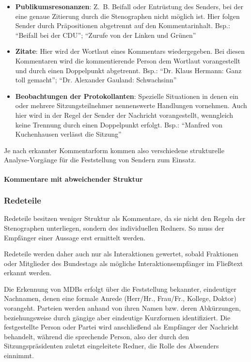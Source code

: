 \begin{itemize}
    \item \textbf{Publikumsresonanzen}: Z.~B. Beifall oder Entrüstung des
        Senders, bei der eine genaue Zitierung durch die Stenographen nicht
        möglich ist. Hier folgen Sender durch Präpositionen abgetrennt auf den
        Kommentarinhalt. Bsp.: \enquote{Beifall bei der CDU}; \enquote{Zurufe
        von der Linken und Grünen}
    \item \textbf{Zitate}: Hier wird der Wortlaut eines Kommentars
        wiedergegeben. Bei diesen Kommentaren wird die kommentierende Person
        dem Wortlaut vorangestellt und durch einen Doppelpunkt abgetrennt.
        Bsp.: \enquote{Dr. Klaus Hermann: Ganz toll gemacht}; \enquote{Dr.
        Alexander Gauland: Schwachsinn}
    \item \textbf{Beobachtungen der Protokollanten}: Spezielle Situationen in
        denen ein oder mehrere Sitzungsteilnehmer nennenswerte Handlungen
        vornehmen. Auch hier wird in der Regel der Sender der Nachricht
        vorangestellt, wenngleich keine Trennung durch einen Doppelpunkt
        erfolgt. Bsp.: \enquote{Manfred von Kuchenhausen verlässt die Sitzung}
\end{itemize}

Je nach erkannter Kommentarform kommen also verschiedene strukturelle
Analyse-Vorgänge für die Feststellung von Sendern zum Einsatz.

\paragraph{Kommentare mit abweichender Struktur}
\subsubsection{Redeteile}
Redeteile besitzen weniger Struktur als Kommentare, da sie nicht den Regeln
der Stenographen unterliegen, sondern des individuellen Redners. So muss der
Empfänger einer Aussage erst ermittelt werden.

Redeteile werden daher auch nur als Interaktionen gewertet, sobald Fraktionen
oder Mitglieder des Bundestags als mögliche Interaktionsempfänger im Fließtext
erkannt werden.

Die Erkennung von MDBs erfolgt über die Feststellung bekannter, eindeutiger
Nachnamen, denen eine formale Anrede (Herr/Hr., Frau/Fr., Kollege, Doktor)
vorangeht. Parteien werden anhand von ihren Namen bzw. deren Abkürzungen,
beziehungsweise durch gängige aber eindeutige Kurzformen identifiziert. Die
festgestellte Person oder Partei wird anschließend als Empfänger der
Nachricht behandelt, während die sprechende Person, also der durch den
Sitzungspräsidenten zuletzt eingeleitete Redner, die Rolle des Absenders
einnimmt.

